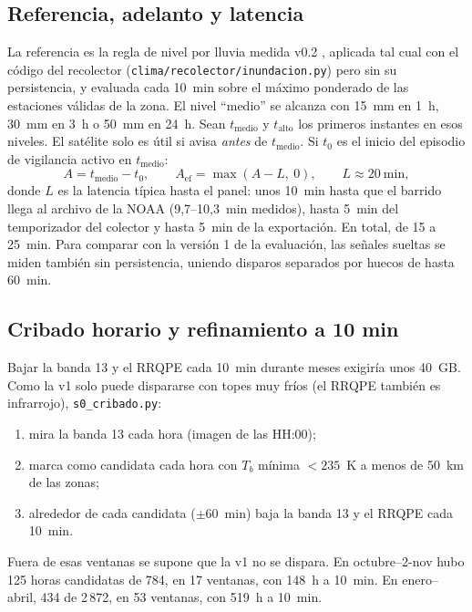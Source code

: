 \documentclass{sosg-informe}
\begin{document}
\subsection{Referencia, adelanto y latencia}
La referencia es la regla de nivel por lluvia medida v0.2 \citep{sosg202607}, aplicada tal cual con el código del recolector (\texttt{clima/recolector/\allowbreak inundacion.py}) pero sin su persistencia, y evaluada cada 10~min sobre el máximo ponderado de las estaciones válidas de la zona. El nivel \enquote{medio} se alcanza con 15~mm en 1~h, 30~mm en 3~h o 50~mm en 24~h. Sean $t_{\text{medio}}$ y $t_{\text{alto}}$ los primeros instantes en esos niveles. El satélite solo es útil si avisa \emph{antes} de $t_{\text{medio}}$. Si $t_0$ es el inicio del episodio de vigilancia activo en $t_{\text{medio}}$:
\begin{equation}
  A = t_{\text{medio}} - t_0, \qquad A_{\text{ef}} = \max(A - L,\ 0), \qquad L \approx 20~\text{min},
  \label{eq:adelanto}
\end{equation}
donde $L$ es la latencia típica hasta el panel: unos 10~min hasta que el barrido llega al archivo de la NOAA (9,7--10,3~min medidos), hasta 5~min del temporizador del colector y hasta 5~min de la exportación. En total, de 15 a 25~min. Para comparar con la versión 1 de la evaluación, las señales sueltas se miden también sin persistencia, uniendo disparos separados por huecos de hasta 60~min.

\subsection{Cribado horario y refinamiento a 10 min}\label{sec:cribado}
Bajar la banda 13 y el RRQPE cada 10~min durante meses exigiría unos 40~GB. Como la v1 solo puede dispararse con topes muy fríos (el RRQPE también es infrarrojo), \texttt{s0\_cribado.py}:
\begin{enumerate}
  \item mira la banda 13 cada hora (imagen de las HH:00);
  \item marca como candidata cada hora con $T_b$ mínima $< 235$~K a menos de 50~km de las zonas;
  \item alrededor de cada candidata ($\pm 60$~min) baja la banda 13 y el RRQPE cada 10~min.
\end{enumerate}
Fuera de esas ventanas se supone que la v1 no se dispara. En octubre--2-nov hubo 125 horas candidatas de 784, en 17 ventanas, con 148~h a 10~min. En enero--abril, 434 de 2\,872, en 53 ventanas, con 519~h a 10~min.
\end{document}

